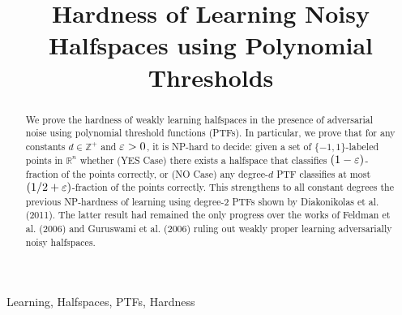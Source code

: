 \documentclass[final,12pt]{colt2018} %
\title[Hardness of Learning Halfspaces using PTFs]{Hardness of Learning Noisy Halfspaces using Polynomial Thresholds}
\begin{document}
\maketitle

\begin{abstract}
We prove the hardness of weakly learning halfspaces in the presence of adversarial noise using polynomial threshold functions (PTFs). In particular, we prove that for any constants $d \in \mathbb{Z}^+$ and $\varepsilon > 0$, it is NP-hard to decide: given a set of $\{-1,1\}$-labeled points in $\mathbb{R}^n$  whether (YES Case) there exists a halfspace that classifies $(1-\varepsilon)$-fraction of the points correctly, or (NO Case) any degree-$d$ PTF classifies at most $(1/2 + \varepsilon)$-fraction of the points correctly. This strengthens to all constant degrees the previous NP-hardness of learning using degree-$2$ PTFs shown by Diakonikolas et al. (2011). The latter result had remained the only progress over the works of Feldman et al. (2006) and Guruswami et al. (2006) ruling out weakly proper learning adversarially noisy halfspaces.
\end{abstract}

\begin{keywords}
Learning, Halfspaces, PTFs, Hardness
\end{keywords}












%



\end{document}
